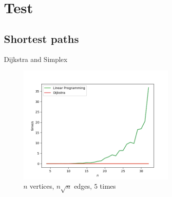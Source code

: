 \section{Test}

\subsection{Shortest paths}

\begin{frame}{Dijkstra and Simplex}

    \begin{figure}
        \includegraphics[width=0.7\textwidth]{assets/shortest_path_compare.png}
        \caption{$n$ vertices, $n\sqrt{n}$ edges, $5$ times}
    \end{figure}

\end{frame}